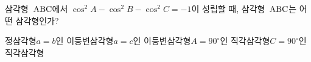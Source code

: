 삼각형~$\mathrm{ABC}$에서 $\cos^2 A-\cos^2 B-\cos^2 C=-1$이 성립할 때, 삼각형~$\mathrm{ABC}$는 어떤 삼각형인가?
\begin{choicesii}{정삼각형}{$a=b$인 이등변삼각형}{$a=c$인 이등변삼각형}{$A=90^\circ$인 직각삼각형}{$C=90^\circ$인 직각삼각형}\end{choicesii}
